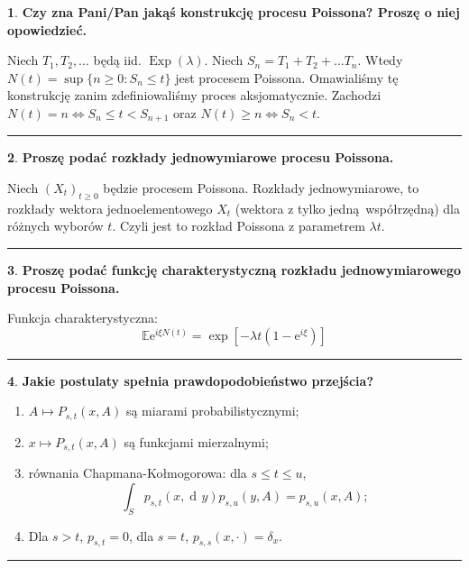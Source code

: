 \documentclass[
    twocolumn,
    twoside,
    fontsize=11pt,
    paper=A0,
    DIV=30
]{scrartcl}
\theoremstyle{definition}
\newtheorem{pytanie}{}
\theoremstyle{break}
\newenvironment{odpowiedź}{\vspace{-0.7em}}{\vspace{0.3em}\hrule}
\newcommand*{\e}{\mathrm{e}}
\DeclareMathOperator{\diff}{d\!}
\begin{document}
\begin{pytanie}
\textbf{Czy zna Pani/Pan jakąś konstrukcję procesu Poissona? Proszę o niej opowiedzieć.}
\end{pytanie}
\begin{odpowiedź}
    Niech $T_1, T_2, \ldots$ będą iid. $\operatorname{Exp}(\lambda)$.
    Niech $S_n = T_1 + T_2 + \ldots T_n$.
    Wtedy $N(t) =\sup\{n \geq 0: S_n \leq t\}$ jest procesem Poissona.
    Omawialiśmy tę konstrukcję zanim zdefiniowaliśmy proces aksjomatycznie.
    Zachodzi $N(t) = n \iff S_n \leq t < S_{n+1}$ oraz $N(t) \geq n \iff S_n < t$.
\end{odpowiedź}


\begin{pytanie}
\textbf{Proszę podać rozkłady jednowymiarowe procesu Poissona.}
\end{pytanie}
\begin{odpowiedź}
    Niech $(X_t)_{t\geq 0}$ będzie procesem Poissona.
    Rozkłady jednowymiarowe, to rozkłady wektora jednoelementowego
    $X_t$ (wektora z tylko jedną współrzędną) dla różnych wyborów $t$.
    Czyli jest to rozkład Poissona z parametrem $\lambda t$.
\end{odpowiedź}


\begin{pytanie}
\textbf{Proszę podać funkcję charakterystyczną rozkładu jednowymiarowego procesu Poissona.}
\end{pytanie}
\begin{odpowiedź}
    Funkcja charakterystyczna: \[
    \mathbb{E}\e^{i\xi N(t)} = \exp[-\lambda t (1 - \e^{i\xi})]
    \]
\end{odpowiedź}


\begin{pytanie}
\textbf{Jakie postulaty spełnia prawdopodobieństwo przejścia?}
\end{pytanie}
\begin{odpowiedź}
\begin{enumerate}
    \item $A \mapsto P_{s,t} (x,A)$ są miarami probabilistycznymi;
    \item $x \mapsto P_{s,t}(x,A)$ są funkcjami mierzalnymi;
    \item równania Chapmana-Kołmogorowa: dla $s \leq t \leq u$, \[
    \int_S p_{s,t}(x, \diff y) p_{s, u}(y, A) = p_{s, u}(x, A);
    \] 
    \item Dla $s>t$, $p_{s, t} = 0$, dla $s = t$, $p_{s,s}(x, \cdot) = \delta_x$.
\end{enumerate}
\end{odpowiedź}
\end{document}
